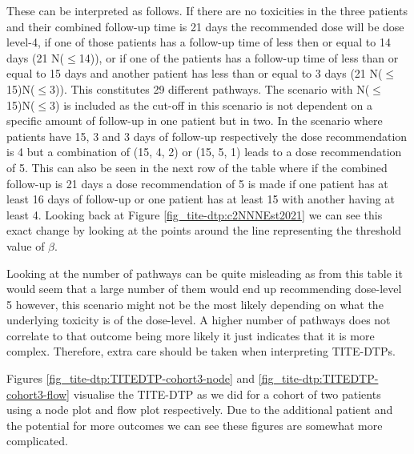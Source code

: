 These can be interpreted as follows. If there are no toxicities in the three patients and their combined follow-up time is 21 days the recommended dose will be dose level-4, if one of those patients has a follow-up time of less then or equal to 14 days (21 N($\leq$14)), or if one of the patients has a follow-up time of less than or equal to 15 days and another patient has less than or equal to 3 days (21 N($\leq$15)N($\leq$3)). This constitutes 29 different pathways. The scenario with N($\leq$15)N($\leq$3) is included as the cut-off in this scenario is not dependent on a specific amount of follow-up in one patient but in two. In the scenario where patients have 15, 3 and 3 days of follow-up respectively the dose recommendation is 4 but a combination of (15, 4, 2) or (15, 5, 1) leads to a dose recommendation of 5. This can also be seen in the next row of the table where if the combined follow-up is 21 days a dose recommendation of 5 is made if one patient has at least 16 days of follow-up or one patient has at least 15 with another having at least 4. Looking back at Figure \ref{fig_tite-dtp:c2NNNEst2021} we can see this exact change by looking at the points around the line representing the threshold value of $\beta$.

Looking at the number of pathways can be quite misleading as from this table it would seem that a large number of them would end up recommending dose-level 5 however, this scenario might not be the most likely depending on what the underlying toxicity is of the dose-level. A higher number of pathways does not correlate to that outcome being more likely it just indicates that it is more complex. Therefore, extra care should be taken when interpreting TITE-DTPs. 

Figures \ref{fig_tite-dtp:TITEDTP-cohort3-node} and \ref{fig_tite-dtp:TITEDTP-cohort3-flow} visualise the TITE-DTP as we did for a cohort of two patients using a node plot and flow plot respectively. Due to the additional patient and the potential for more outcomes we can see these figures are somewhat more complicated.

